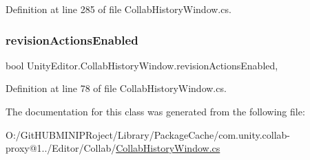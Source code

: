 Definition at line 285 of file Collab\+History\+Window.\+cs.

\mbox{\label{class_unity_editor_1_1_collab_history_window_add615e0b09468afea675e2851124cc49}} 
\subsubsection{\texorpdfstring{revisionActionsEnabled}{revisionActionsEnabled}}
{\footnotesize\ttfamily bool Unity\+Editor.\+Collab\+History\+Window.\+revision\+Actions\+Enabled\hspace{0.3cm}{\ttfamily [get]}, {\ttfamily [set]}}



Definition at line 78 of file Collab\+History\+Window.\+cs.



The documentation for this class was generated from the following file\+:\begin{DoxyCompactItemize}
\item 
O\+:/\+Git\+H\+U\+B\+M\+I\+N\+I\+P\+Roject/\+Library/\+Package\+Cache/com.\+unity.\+collab-\/proxy@1../\+Editor/\+Collab/\mbox{\hyperlink{_collab_history_window_8cs}{Collab\+History\+Window.\+cs}}\end{DoxyCompactItemize}
